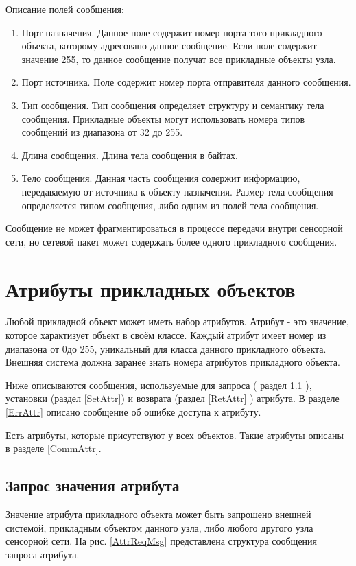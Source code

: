 Описание полей сообщения:
\begin{enumerate}
\item Порт назначения. Данное поле содержит номер порта того прикладного объекта, которому
адресовано данное сообщение. Если поле содержит значение 255, то данное сообщение получат все
прикладные объекты узла.
\item Порт источника. Поле содержит номер порта отправителя данного сообщения.
\item Тип сообщения. Тип сообщения определяет структуру и семантику тела сообщения. Прикладные 
объекты могут использовать номера типов сообщений из диапазона от 32 до 255.
\item Длина сообщения. Длина тела сообщения в байтах.
\item Тело сообщения. Данная часть сообщения содержит информацию, передаваемую от источника к
объекту назначения. Размер тела сообщения определяется типом сообщения, либо одним из полей
тела сообщения.
\end{enumerate}

Сообщение не может фрагментироваться в процессе передачи внутри сенсорной сети, но сетевой
пакет может содержать более одного прикладного сообщения.

\section{Атрибуты прикладных объектов}

    Любой прикладной объект может иметь набор атрибутов. Атрибут - это значение, которое характизует объект
в своём классе. Каждый атрибут имеет номер из диапазона от 0до 255, уникальный для класса данного прикладного объекта. 
Внешняя система должна заранее знать номера атрибутов прикладного объекта.

    Ниже описываются сообщения, используемые для запроса ( раздел \ref{ReqAttr} ), установки (раздел \ref{SetAttr})
и возврата (раздел \ref{RetAttr} ) атрибута. В разделе \ref{ErrAttr} описано сообщение об ошибке доступа к атрибуту.

    Есть атрибуты, которые присутствуют у всех объектов. Такие атрибуты описаны в разделе \ref{CommAttr}.

\subsection{Запрос значения атрибута}
\label{ReqAttr}
    Значение атрибута прикладного объекта может быть запрошено внешней системой, прикладным объектом
данного узла, либо любого другого узла сенсорной сети. На рис. \ref{AttrReqMsg} представлена структура
сообщения запроса атрибута.

